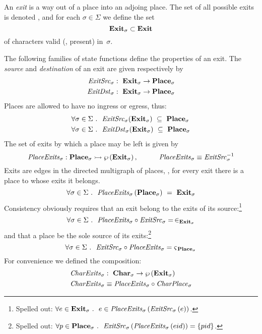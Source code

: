 An {\em exit} is a way out of a place into an adjoing place.
The set of all possible exits is denoted \exitset{},
and for each $\sigma \in \Sigma$ we define the set
\[ \textbf{Exit}_{\sigma} \subset \textbf{Exit}_{} \]
of characters valid (\ie, present) in~$\sigma$.

The following families of
state functions define the properties of an exit.
The {\em source} and {\em destination} of an exit are given
respectively by
\begin{align*}
\mathit{ExitSrc}_{\sigma}:~ \textbf{Exit}_{\sigma} \rightarrow \textbf{Place}_{\sigma} \\
\mathit{ExitDst}_{\sigma}:~ \textbf{Exit}_{\sigma} \rightarrow \textbf{Place}_{\sigma}
\end{align*}
Places are allowed to have no ingress or egress, thus:
\begin{align*}
\forall \sigma \in \Sigma
~.~~ & \mathit{ExitSrc}_{\sigma}(\textbf{Exit}_{\sigma}) ~\subseteq~ \textbf{Place}_{\sigma} \\
\forall \sigma \in \Sigma
~.~~ & \mathit{ExitDst}_{\sigma}(\textbf{Exit}_{\sigma}) ~\subseteq~ \textbf{Place}_{\sigma}
\end{align*}
The set of exits by which a place may be left is given by
\[ \mathit{PlaceExits}_{\sigma}: \textbf{Place}_{\sigma} \rightarrowtail
\wp\left(\textbf{Exit}_{\sigma}\right),
~~~~~~~~~\mathit{PlaceExits}_{\sigma} \equiv \mathit{ExitSrc}_{\sigma}^{-1} \]
Exits are edges in the directed multigraph of places, \ie, for every
exit there is a place to whose exits it belongs.
\[ \forall \sigma \in \Sigma
~.~~ \mathit{PlaceExits}_{\sigma}\left(\textbf{Place}_{\sigma}\right) ~=~ \textbf{Exit}_{\sigma}
\]
Consistency obviously requires that an exit belong to the exits of its
source:\footnote{Spelled out: $\forall e \in \textbf{Exit}_{\sigma}~.~~
  e \in \mathit{PlaceExits}_{\sigma}\left(\mathit{ExitSrc}_{\sigma}\left(e\right)\right)$.}
\[ \forall \sigma \in \Sigma ~.~~ \mathit{PlaceExits}_{\sigma} \circ
\mathit{ExitSrc}_{\sigma} = \,\in_{\textbf{Exit}_{\sigma}} \]
and that a place be the sole source of its exits:\footnote{Spelled
  out: $\forall p \in \textbf{Place}_{\sigma}~.~~
  \mathit{ExitSrc}_{\sigma}\left(\mathit{PlaceExits}_{\sigma}\left(eid\right)\right) = \{ pid \}$.}
\[
\forall \sigma \in \Sigma ~.~~ 
\mathit{ExitSrc}_{\sigma} \circ \mathit{PlaceExits}_{\sigma}
  = \mathit{\varsigma_{\,\textbf{Place}_{\sigma}}}
\]
For convenience we defined the composition:
\begin{align*}
& \mathit{CharExits}_{\sigma}:~ \textbf{Char}_{\sigma} \rightarrow \wp\left(\textbf{Exit}_{\sigma}\right) \\
& \mathit{CharExits}_{\sigma} \equiv \mathit{PlaceExits}_{\sigma} \circ \mathit{CharPlace}_{\sigma}
\end{align*}
